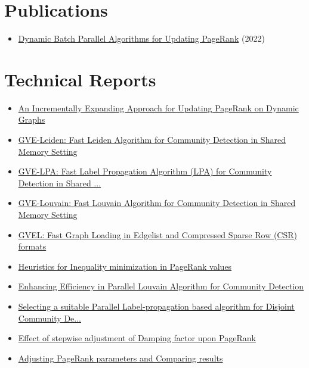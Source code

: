 \section*{Publications}

\begin{itemize}[noitemsep, leftmargin=*]
  \item \href{https://ieeexplore.ieee.org/abstract/document/9835216/}{Dynamic Batch Parallel Algorithms for Updating PageRank} (2022)
\end{itemize}




\section*{Technical Reports}

\begin{itemize}[noitemsep, leftmargin=*]
  \item \href{https://arxiv.org/abs/2401.03256}{An Incrementally Expanding Approach for Updating PageRank on Dynamic Graphs}
  \item \href{https://arxiv.org/abs/2312.13936}{GVE-Leiden: Fast Leiden Algorithm for Community Detection in Shared Memory Setting}
  \item \href{https://arxiv.org/abs/2312.08140}{GVE-LPA: Fast Label Propagation Algorithm (LPA) for Community Detection in Shared ...}
  \item \href{https://arxiv.org/abs/2312.04876}{GVE-Louvain: Fast Louvain Algorithm for Community Detection in Shared Memory Setting}
  \item \href{https://arxiv.org/abs/2311.14650}{GVEL: Fast Graph Loading in Edgelist and Compressed Sparse Row (CSR) formats}
  \item \href{https://arxiv.org/abs/2310.18537}{Heuristics for Inequality minimization in PageRank values}
  \item \href{https://arxiv.org/abs/2301.12390}{Enhancing Efficiency in Parallel Louvain Algorithm for Community Detection}
  \item \href{https://arxiv.org/abs/2301.09125}{Selecting a suitable Parallel Label-propagation based algorithm for Disjoint Community De...}
  \item \href{https://arxiv.org/abs/2108.04150}{Effect of stepwise adjustment of Damping factor upon PageRank}
  \item \href{https://arxiv.org/abs/2108.02997}{Adjusting PageRank parameters and Comparing results}
\end{itemize}
